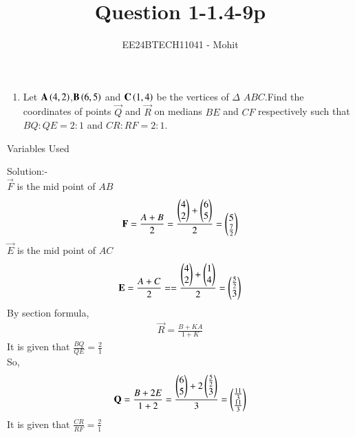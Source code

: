 \documentclass[journal]{IEEEtran}
\numberwithin{equation}{enumi}
\numberwithin{figure}{enumi}
\begin{document}

\title{Question 1-1.4-9p}
\author{EE24BTECH11041 - Mohit}
{\let\newpage\relax\maketitle}
\begin{enumerate}
	\item Let $\mathbf{A}\left(4,2\right)$,$\mathbf{B}\left(6,5\right)$ and $\mathbf{C}\left(1,4\right)$ be the vertices of $\Delta$ $ABC$.Find the coordinates of points $\vec{Q}$ and $\vec{R}$ on medians $BE$ and $CF$ respectively such that $BQ:QE=2:1$ and $CR:RF=2:1$.
\end{enumerate}
\begin{table}[h!]    
  \centering
  
  \caption{Variables Used}
  \label{tab10.5.3.9.1}
\end{table}
Solution:-\\
$\vec{F}$ is the mid point of $AB$\\
\begin{align}
	\mathbf{F}=\frac{A+B}{2}=\frac{\begin{pmatrix}4\\2\end{pmatrix} + \begin{pmatrix}6\\5\end{pmatrix}}{2}
=\begin{pmatrix}5\\ \frac{7}{2}\end{pmatrix}
\end{align}
$\vec{E}$ is the mid point of $AC$\\
\begin{align}
	\mathbf{E}=\frac{A+C}{2}==\frac{\begin{pmatrix}4\\2\end{pmatrix} + \begin{pmatrix}1\\4\end{pmatrix}}{2}
=\begin{pmatrix}\frac{5}{2}\\3\end{pmatrix}
\end{align}
By section formula,
\begin{align}
	\vec{R}=\frac{B+KA}{1+K}
\end{align}
It is given that $\frac{BQ}{QE}=\frac{2}{1}$\\
So,\\
\begin{align}
	\mathbf{Q}=\frac{B+2E}{1+2}=\frac{\begin{pmatrix}6\\5\end{pmatrix} + 2\begin{pmatrix}\frac{5}{2}\\3\end{pmatrix}}{3}=\begin{pmatrix}\frac{11}{3}\\ \frac{11}{3}\end{pmatrix}
\end{align}
It is given that $\frac{CR}{RF}=\frac{2}{1}$\\
\end{document}
